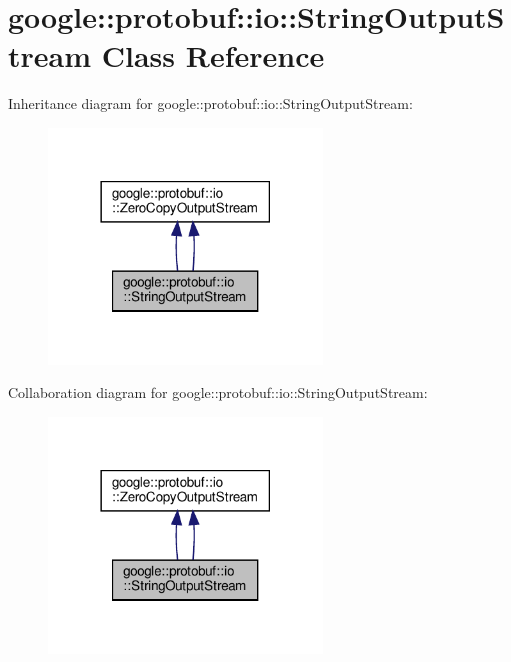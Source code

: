 \hypertarget{classgoogle_1_1protobuf_1_1io_1_1StringOutputStream}{}\section{google\+:\+:protobuf\+:\+:io\+:\+:String\+Output\+Stream Class Reference}
\label{classgoogle_1_1protobuf_1_1io_1_1StringOutputStream}


Inheritance diagram for google\+:\+:protobuf\+:\+:io\+:\+:String\+Output\+Stream\+:
\nopagebreak
\begin{figure}[H]
\begin{center}
\leavevmode
\includegraphics[width=206pt]{classgoogle_1_1protobuf_1_1io_1_1StringOutputStream__inherit__graph}
\end{center}
\end{figure}


Collaboration diagram for google\+:\+:protobuf\+:\+:io\+:\+:String\+Output\+Stream\+:
\nopagebreak
\begin{figure}[H]
\begin{center}
\leavevmode
\includegraphics[width=206pt]{classgoogle_1_1protobuf_1_1io_1_1StringOutputStream__coll__graph}
\end{center}
\end{figure}

